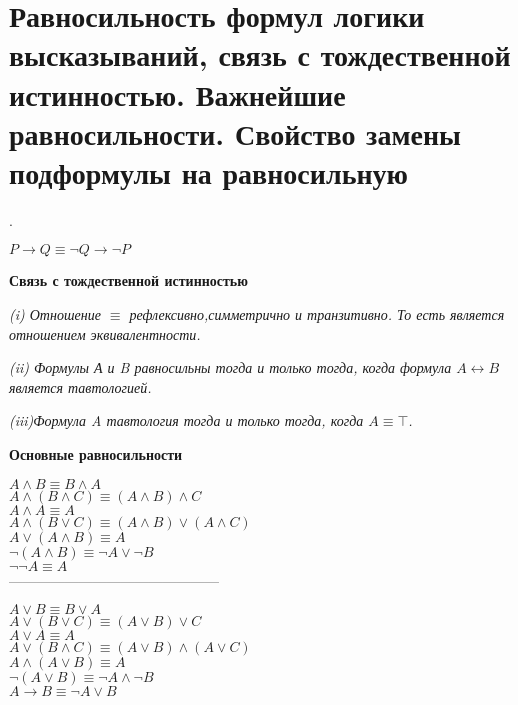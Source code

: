 \section{Равносильность формул логики высказываний, связь с тождественной истинностью. Важнейшие равносильности.
Свойство замены подформулы на равносильную}.
 \label{formula}
\begin{example}
	${P}\to{Q}  \equiv \neg Q\to{\neg P} $
\end{example}

\begin{center}
	\textbf{Связь с тождественной истинностью}
\end{center}

{

}
\textit{(i) Отношение $\equiv$ рефлексивно,симметрично и
транзитивно. То есть является отношением эквивалентности.}
{

}
\textit{(ii) Формулы А и B равносильны тогда и только тогда, когда формула ${A}\leftrightarrow{B}$ является
тавтологией.}{

}
\textit{(iii)Формула A тавтология тогда и только тогда, когда
${A}\equiv \top $.}

\begin{center}
	\textbf{Основные равносильности}
	{

	}
	$A \wedge B  \equiv B \wedge A $ \\
	$A \wedge(B \wedge C)  \equiv(A \wedge B) \wedge C $ \\
	$A \wedge A  \equiv A $ \\
	$A \wedge(B \vee C)  \equiv(A \wedge B) \vee(A \wedge C)$ \\
	$A \vee(A \wedge B)  \equiv A$ \\
	$ \neg(A \wedge B)  \equiv \neg A \vee \neg B$ \\
	$\neg \neg A  \equiv  A $ \\
	{---------------------------------------------}

	$A \vee B  \equiv B \vee A $\\
	$A \vee(B \vee C)  \equiv(A \vee B) \vee C $ \\
	$A \vee A  \equiv A $  \\
	$A \vee(B \wedge C)  \equiv(A \vee B) \wedge(A \vee C) $ \\
	$A \wedge(A \vee B)  \equiv A $ \\
	$\neg(A \vee B)  \equiv \neg A \wedge \neg B $ \\
	$A \rightarrow B  \equiv \neg A \vee B $

\end{center}







